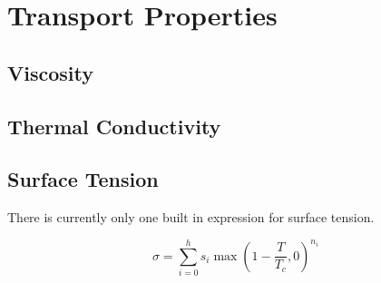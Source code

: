\documentclass[oneside]{book}
\begin{document}
\section{Transport Properties}

\subsection{Viscosity}


\subsection{Thermal Conductivity}

\subsection{Surface Tension} 

There is currently only one built in expression for surface tension.

\begin{equation}
	\sigma = \sum_{i = 0}^h s_i \max\left(1 - \frac{T}{T_c}, 0 \right)^{n_i}
\end{equation}

 
\end{document}
